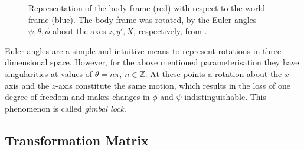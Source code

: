\begin{figure}[t]
\centering
{}
\caption{Representation of the body frame (red) with respect to the world frame (blue). The body frame was rotated, by the Euler angles $\psi, \theta, \phi$ about the axes $z, y', X$, respectively, from \cite{Wiki_taitbryan}.} \label{fig:Euler_angles}
\end{figure}

Euler angles are a simple and intuitive means to represent rotations in three-dimensional space. However, for the above mentioned parameterisation they have singularities at values of $\theta = n \pi$, $n \in \mathbb{Z}$. At these points a rotation about the $x$-axis and the $z$-axis constitute the same motion, which results in the loss of one degree of freedom and makes changes in $\phi$ and $\psi$ indistinguishable. This phenomenon is called \emph{gimbal lock}.

\subsection{Transformation Matrix}


